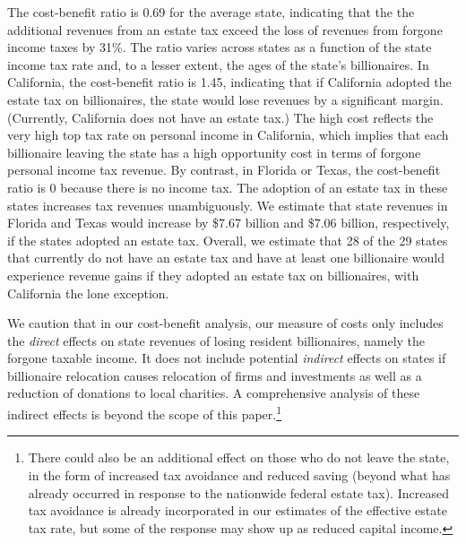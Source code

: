 \documentclass[12pt]{article}
\begin{document}
The cost-benefit ratio is 0.69 for the average state,  indicating that the the additional revenues from an estate tax exceed the loss of revenues from forgone income taxes by 31\%.  The ratio varies across states as a function of the state income tax rate and, to a lesser extent, the ages of the state's billionaires. In California, the cost-benefit ratio is 1.45, indicating that if California adopted the estate tax on billionaires, the state would lose revenues by a significant margin. (Currently, California does not have an estate tax.) The high cost reflects the very high top tax rate on personal income in California, which implies that each billionaire leaving the state has a high opportunity cost in terms of forgone personal income tax revenue.
By contrast, in Florida or Texas, the cost-benefit ratio is 0 because there is no income tax. The adoption of an estate tax in these states increases tax revenues unambiguously. We estimate that state revenues in Florida and Texas would increase by \$7.67 billion and \$7.06 billion, respectively, if the states adopted an estate tax. Overall, we estimate that 28 of the 29 states that currently do not have an estate tax and have at least one billionaire would experience revenue gains if they adopted an estate tax on billionaires, with California the lone exception. 

We caution that in our cost-benefit analysis, our measure of costs only includes the {\it direct} effects on state revenues of losing resident billionaires, namely the forgone taxable income. It does not include potential {\it indirect} effects on states if billionaire relocation causes relocation of firms and investments as well as a reduction of donations to local charities. A comprehensive analysis of these indirect effects is beyond the scope of this paper.\footnote{There could also be an additional effect on those who do not leave the state, in the form of increased tax avoidance and reduced saving (beyond what has already occurred in response to the nationwide federal estate tax). Increased tax avoidance is already incorporated in our estimates of the effective estate tax rate, but some of the response may show up as reduced capital income.}
\end{document}
